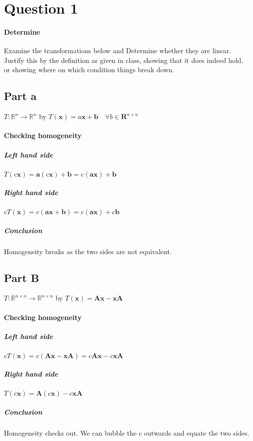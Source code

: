 \documentclass{article}
\begin{document}
    \section{Question 1}
        \paragraph{Determine}
            Examine the transformations below and Determine
            whether they are linear. Justify this by the
            definition as given in class, showing that it does
            indeed hold, or showing where on which condition things
            break down.
        \subsection{Part a}
            $T: \mathbb{R}^n\rightarrow \mathbb{R}^n$
            by
            $T(\mathbf{x})=a\mathbf{x}+\mathbf{b}\quad \forall{b}\in{\mathbf{R}^{n\times n}}$
            \paragraph{Checking homogeneity}
                \subparagraph{Left hand side}
                    $T(c\mathbf{x})=\mathbf{a} (c \mathbf{x})+\mathbf{b}=c(\mathbf{ax})+\mathbf{b}$
                \subparagraph{Right hand side}
                    $c T(\mathbf{x})=c(\mathbf{ax}+\mathbf{b})=c(\mathbf{ax})+c\mathbf{b}$
                \subparagraph{Conclusion}
                    Homogeneity breaks as the two sides are not equivalent.
        \subsection{Part B}
            $T: \mathbb{R}^{n \times n} \rightarrow \mathbb{R}^{n \times n}$
            by
            $T(\mathbf{x})=\mathbf{Ax}-\mathbf{xA}$
            \paragraph{Checking homogeneity}
                \subparagraph{Left hand side}
                    $cT(\mathbf{x})=c(\mathbf{Ax}-\mathbf{xA})=c\mathbf{Ax}-c\mathbf{xA}$
                \subparagraph{Right hand side}
                    $T(c\mathbf{x})=\mathbf{A}(c\mathbf{x})-c\mathbf{xA}$
                \subparagraph{Conclusion}
                    Homogeneity checks out. We can bubble the c outwards and equate the two sides.
\end{document}
